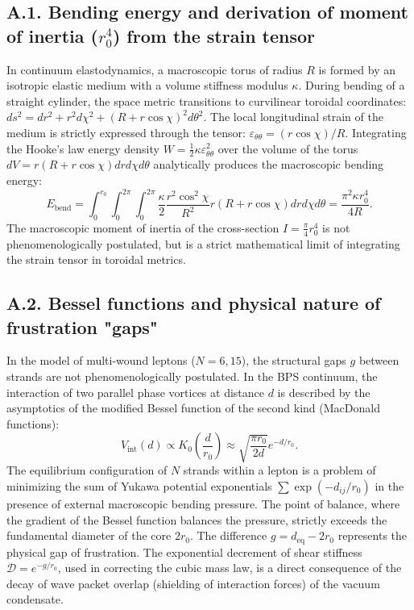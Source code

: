 \documentclass[11pt,a4paper]{article}
\begin{document}
\subsection*{A.1. Bending energy and derivation of moment of inertia ($r_0^4$) from the strain tensor}
In continuum elastodynamics, a macroscopic torus of radius $R$ is formed by an isotropic elastic medium with a volume stiffness modulus $\kappa$. During bending of a straight cylinder, the space metric transitions to curvilinear toroidal coordinates: $ds^2 = dr^2 + r^2 d\chi^2 + (R + r\cos\chi)^2 d\theta^2$.
The local longitudinal strain of the medium is strictly expressed through the tensor: $\varepsilon_{\theta\theta} = (r \cos\chi)/R$.
Integrating the Hooke's law energy density $W = \frac{1}{2} \kappa \varepsilon_{\theta\theta}^2$ over the volume of the torus $dV = r(R + r\cos\chi) dr d\chi d\theta$ analytically produces the macroscopic bending energy:
\begin{equation}
E_{\text{bend}} = \int_0^{r_0} \int_0^{2\pi} \int_0^{2\pi} \frac{\kappa}{2} \frac{r^2 \cos^2\chi}{R^2} r(R + r\cos\chi) dr d\chi d\theta = \frac{\pi^2 \kappa r_0^4}{4 R}.
\end{equation}
The macroscopic moment of inertia of the cross-section $I = \frac{\pi}{4} r_0^4$ is not phenomenologically postulated, but is a strict mathematical limit of integrating the strain tensor in toroidal metrics.

\subsection*{A.2. Bessel functions and physical nature of frustration "gaps"}
In the model of multi-wound leptons ($N=6, 15$), the structural gaps $g$ between strands are not phenomenologically postulated. In the BPS continuum, the interaction of two parallel phase vortices at distance $d$ is described by the asymptotics of the modified Bessel function of the second kind (MacDonald functions):
\begin{equation}
V_{\text{int}}(d) \propto K_0\left(\frac{d}{r_0}\right) \approx \sqrt{\frac{\pi r_0}{2d}} e^{-d/r_0}.
\end{equation}
The equilibrium configuration of $N$ strands within a lepton is a problem of minimizing the sum of Yukawa potential exponentials $\sum \exp(-d_{ij}/r_0)$ in the presence of external macroscopic bending pressure. The point of balance, where the gradient of the Bessel function balances the pressure, strictly exceeds the fundamental diameter of the core $2r_0$.
The difference $g = d_{\text{eq}} - 2r_0$ represents the physical gap of frustration. The exponential decrement of shear stiffness $\mathcal{D} = e^{-g/r_0}$, used in correcting the cubic mass law, is a direct consequence of the decay of wave packet overlap (shielding of interaction forces) of the vacuum condensate.
\end{document}
